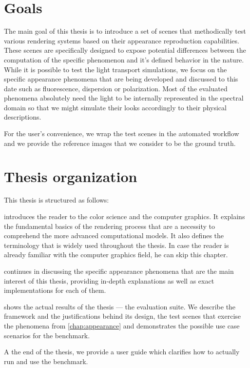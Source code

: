 \section*{Goals}

The main goal of this thesis is to introduce a set of scenes that methodically test various rendering systems based on their appearance reproduction capabilities. These scenes are specifically designed to expose potential differences between the computation of the specific phenomenon and it's defined behavior in the nature. While it is possible to test the light transport simulations, we focus on the specific appearance phenomena that are being developed and discussed to this date such as fluorescence, dispersion or polarization. Most of the evaluated phenomena absolutely need the light to be internally represented in the spectral domain so that we might simulate their looks accordingly to their physical descriptions.

For the user's convenience, we wrap the test scenes in the automated workflow and we provide the reference images that we consider to be the ground truth.

\section*{Thesis organization}

This thesis is structured as follows: 

 introduces the reader to the color science and the computer graphics. It explains the fundamental basics of the rendering process that are a necessity to comprehend the more advanced computational models. It also defines the terminology that is widely used throughout the thesis. In case the reader is already familiar with the computer graphics field, he can skip this chapter. 

 continues in discussing the specific appearance phenomena that are the main interest of this thesis, providing in-depth explanations as well as exact implementations for each of them. 

 shows the actual results of the thesis --- the evaluation suite. We describe the framework and the justifications behind its design, the test scenes that exercise the phenomena from \autoref{chap:appearance} and demonstrates the possible use case scenarios for the benchmark. 

A the end of the thesis, we provide a user guide which clarifies how to actually run and use the benchmark.

